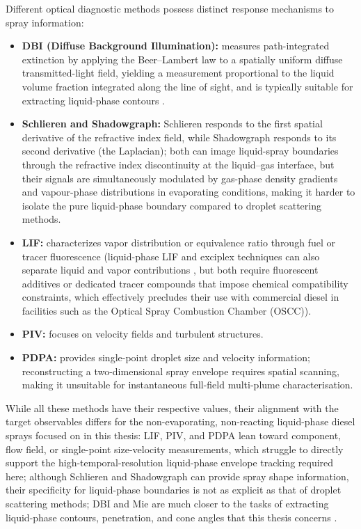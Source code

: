 Different optical diagnostic methods possess distinct response mechanisms to spray information:
\begin{itemize}
  \item \textbf{DBI (Diffuse Background Illumination):} measures path-integrated extinction by applying the Beer--Lambert law to a spatially uniform diffuse transmitted-light field, yielding a measurement proportional to the liquid volume fraction integrated along the line of sight, and is typically suitable for extracting liquid-phase contours \cite{Pickett2011DBISAEref}.
  \item \textbf{Schlieren and Shadowgraph:} Schlieren responds to the first spatial derivative of the refractive index field, while Shadowgraph responds to its second derivative (the Laplacian); both can image liquid-spray boundaries through the refractive index discontinuity at the liquid–gas interface, but their signals are simultaneously modulated by gas-phase density gradients and vapour-phase distributions in evaporating conditions, making it harder to isolate the pure liquid-phase boundary compared to droplet scattering methods.
  \item \textbf{LIF:} characterizes vapor distribution or equivalence ratio through fuel or tracer fluorescence (liquid-phase LIF and exciplex techniques can also separate liquid and vapor contributions \cite{Suzuki1993}, but both require fluorescent additives or dedicated tracer compounds that impose chemical compatibility constraints, which effectively precludes their use with commercial diesel in facilities such as the Optical Spray Combustion Chamber (OSCC)).
  \item \textbf{PIV:} focuses on velocity fields and turbulent structures.
  \item \textbf{PDPA:} provides single-point droplet size and velocity information; reconstructing a two-dimensional spray envelope requires spatial scanning, making it unsuitable for instantaneous full-field multi-plume characterisation.
\end{itemize}
While all these methods have their respective values, their alignment with the target observables differs for the non-evaporating, non-reacting liquid-phase diesel sprays focused on in this thesis: LIF, PIV, and PDPA lean toward component, flow field, or single-point size-velocity measurements, which struggle to directly support the high-temporal-resolution liquid-phase envelope tracking required here; although Schlieren and Shadowgraph can provide spray shape information, their specificity for liquid-phase boundaries is not as explicit as that of droplet scattering methods; DBI and Mie are much closer to the tasks of extracting liquid-phase contours, penetration, and cone angles that this thesis concerns \cite{Linne2013SprayImaging}.
